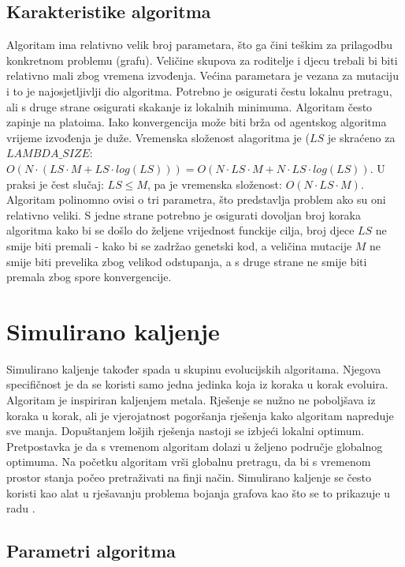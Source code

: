 \documentclass[times, utf8, diplomski, numeric]{fer}
\begin{document}
\subsection{Karakteristike algoritma}

Algoritam ima relativno velik broj parametara, što ga čini teškim za prilagodbu konkretnom problemu (grafu). Veličine skupova za roditelje i djecu trebali bi biti relativno mali zbog vremena izvođenja. Većina parametara je vezana za mutaciju i to je najosjetljivlji dio algoritma. Potrebno je osigurati čestu lokalnu pretragu, ali s druge strane osigurati skakanje iz lokalnih minimuma. Algoritam često zapinje na platoima. Iako konvergencija može biti brža od agentskog algoritma vrijeme izvođenja je duže.
Vremenska složenost alagoritma je ($LS$ je skraćeno za $LAMBDA\_SIZE$: $O(N\cdot(LS \cdot M + LS\cdot log(LS)))=O(N\cdot LS\cdot M + N\cdot LS \cdot log(LS))$. U praksi je čest slučaj: $LS\le M$, pa je vremenska složenost: $O(N\cdot LS \cdot M)$. Algoritam polinomno ovisi o tri parametra, što predstavlja problem ako su oni relativno veliki. S jedne strane potrebno je osigurati dovoljan broj koraka algoritma kako bi se došlo do željene vrijednost funckije cilja, broj djece $LS$ ne smije biti premali - kako bi se zadržao genetski kod, a veličina mutacije $M$ ne smije biti prevelika zbog velikod odstupanja, a s druge strane ne smije biti premala zbog spore konvergencije. 

\section{Simulirano kaljenje}

Simulirano kaljenje također spada u skupinu evolucijskih algoritama. Njegova specifičnost je da se koristi samo jedna jedinka koja iz koraka u korak evoluira. Algoritam je inspiriran kaljenjem metala. Rješenje se nužno ne poboljšava iz koraka u korak, ali je vjerojatnost pogoršanja rješenja kako algoritam napreduje sve manja. Dopuštanjem lošjih rješenja nastoji se izbjeći lokalni optimum. Pretpostavka je da s vremenom algoritam dolazi u željeno područje globalnog optimuma. Na početku algoritam vrši globalnu pretragu, da bi s vremenom prostor stanja počeo pretraživati na finji način. Simulirano kaljenje se često koristi kao alat u rješavanju problema bojanja grafova kao što se to prikazuje u radu \cite{lit13}.

\subsection{Parametri algoritma}
\end{document}
